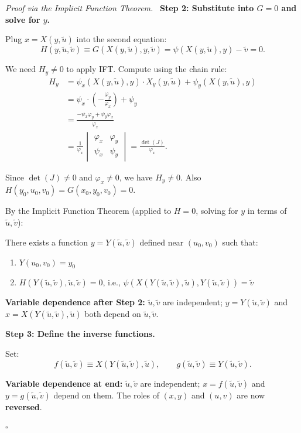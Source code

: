\documentclass[11pt]{report}
\renewenvironment{proof}[1][Proof]{\par\noindent\textit{#1.}\ }{\hfill$\square$\par\medskip}
\begin{document}
\begin{proof}[Proof via the Implicit Function Theorem]
\medskip
\textbf{Step 2: Substitute into $G = 0$ and solve for $y$.}

Plug $x = X(y, \tilde{u})$ into the second equation:
\[
H(y, \tilde{u}, \tilde{v}) \equiv G(X(y, \tilde{u}), y, \tilde{v}) = \psi(X(y, \tilde{u}), y) - \tilde{v} = 0.
\]

We need $H_y \neq 0$ to apply IFT. Compute using the chain rule:
\begin{align*}
H_y &= \psi_x(X(y,\tilde{u}), y) \cdot X_y(y, \tilde{u}) + \psi_y(X(y,\tilde{u}), y) \\[4pt]
&= \psi_x \cdot \left( -\frac{\varphi_y}{\varphi_x} \right) + \psi_y \\[4pt]
&= \frac{-\psi_x \varphi_y + \psi_y \varphi_x}{\varphi_x} \\[4pt]
&= \frac{1}{\varphi_x} \begin{vmatrix} \varphi_x & \varphi_y \\ \psi_x & \psi_y \end{vmatrix} = \frac{\det(J)}{\varphi_x}.
\end{align*}

Since $\det(J) \neq 0$ and $\varphi_x \neq 0$, we have $H_y \neq 0$. Also $H(y_0, u_0, v_0) = G(x_0, y_0, v_0) = 0$.

By the Implicit Function Theorem (applied to $H = 0$, solving for $y$ in terms of $\tilde{u}, \tilde{v}$):

There exists a function $y = Y(\tilde{u}, \tilde{v})$ defined near $(u_0, v_0)$ such that:
\begin{enumerate}[label=(\roman*), itemsep=2pt]
    \item $Y(u_0, v_0) = y_0$
    \item $H(Y(\tilde{u}, \tilde{v}), \tilde{u}, \tilde{v}) = 0$, i.e., $\psi(X(Y(\tilde{u},\tilde{v}), \tilde{u}), Y(\tilde{u}, \tilde{v})) = \tilde{v}$
\end{enumerate}

\textbf{Variable dependence after Step 2:} $\tilde{u}, \tilde{v}$ are independent; $y = Y(\tilde{u}, \tilde{v})$ and $x = X(Y(\tilde{u}, \tilde{v}), \tilde{u})$ both depend on $\tilde{u}, \tilde{v}$.

\medskip
\textbf{Step 3: Define the inverse functions.}

Set:
\[
f(\tilde{u}, \tilde{v}) \equiv X(Y(\tilde{u}, \tilde{v}), \tilde{u}), \qquad g(\tilde{u}, \tilde{v}) \equiv Y(\tilde{u}, \tilde{v}).
\]

\textbf{Variable dependence at end:} $\tilde{u}, \tilde{v}$ are independent; $x = f(\tilde{u}, \tilde{v})$ and $y = g(\tilde{u}, \tilde{v})$ depend on them. The roles of $(x,y)$ and $(u,v)$ are now \textbf{reversed}.


\end{proof}
\end{document}
